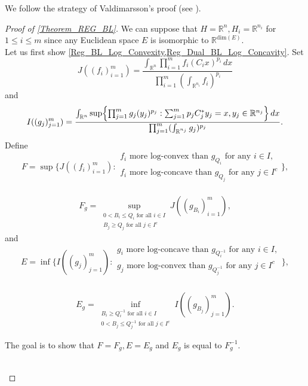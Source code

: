 \documentclass[11pt,a4paper,reqno]{amsart}
\numberwithin{equation}{section}
\theoremstyle{definition}
\newcommand{\ds}{\displaystyle}
\newcommand{\<}{\ensuremath \leq}
\renewcommand{\>}{\ensuremath \geq}
\begin{document}
\bigskip

We follow the strategy of Valdimarsson's proof (see \cite{Vald1}). 


\begin{proof}[Proof of \cref{Theorem_REG_BL}]
We can suppose that $H=\mathbb{R}^n, H_i=\mathbb{R}^{n_i}$ for $1 \leq i \leq m$ since any Euclidean space $E$ is isomorphic to $\mathbb{R}^{\mathrm{dim}(E)}.$ \hfill \\
Let us first show \cref{Reg_BL_Log_Convexity,Reg_Dual_BL_Log_Concavity}. 
Set $$J((f_i)_{i=1}^m)=\frac{\int_{\mathbb{R}^n}\prod_{i=1}^m f_i(C_i x)^{p_i}\, dx}{\prod_{i=1}^m (\int_{\mathbb{R}^{n_i}} f_i)^{p_i}}$$ and $$I((g_j)_{j=1}^m)=\frac{\int_{\mathbb{R}^n}\sup \Bigl \{ \prod_{j=1}^m g_j(y_j)^{p_j}: \sum_{j=1}^m p_jC_j^*y_j=x, y_j \in \mathbb{R}^{n_j}\Bigl \}\, dx}{\prod_{j=1}^m (\int_{\mathbb{R}^{n_j}}g_j)^{p_j}}.$$ Define $$F=\sup \Biggl \{ J((f_i)_{i=1}^m) : \substack{\ds f_i \text{ more log-convex than } g_{Q_i} \text{ for any } i \in I, \\ \ds f_i \text{ more log-concave than } g_{Q_j} \text{ for any } j \in I^c} \Biggl \},$$ \hfill \\  $$F_g=\sup_{\substack{0<B_i \leq Q_i \text{ for all } i \in I \\  B_j \geq Q_j \text{ for all } j \in I^c}}J((g_{B_i})_{i=1}^m),$$ and $$E=\inf \Biggl \{ I((g_j)_{j=1}^m): \substack{\ds g_i \text{ more log-concave than } g_{Q_i^{-1}} \text{ for any } i \in I,\\ \ds g_j \text{ more log-convex than } g_{Q_j^{-1}} \text{ for any } j \in I^c  \\ } \Biggl\},$$ \hfill \\ $$E_g=\inf_{\substack{B_i \geq Q_i^{-1} \text{ for all } i \in I \\ 0<B_j \leq  Q_j^{-1} \text{ for all } j \in I^c}}  I((g_{B_j})_{j=1}^m).$$

The goal is to show that $F=F_g, E=E_g$ and $E_g$ is equal to $F_g^{-1}.$ 

\hfill \\




\end{proof}
\end{document}
